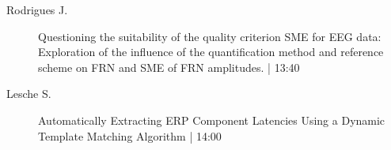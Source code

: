 \begin{symposium}
\begin{description}
                \item [ Rodrigues J.] Questioning the suitability of the quality criterion SME for EEG data: Exploration of the influence of the quantification method and reference scheme on FRN and SME of FRN amplitudes. \textcolor{mygray}{ | 13:40}    
                
                \item [ Lesche S.] Automatically Extracting ERP Component Latencies Using a Dynamic Template Matching Algorithm \textcolor{mygray}{ | 14:00}    
                
            \end{description} 
            \end{symposium}
            